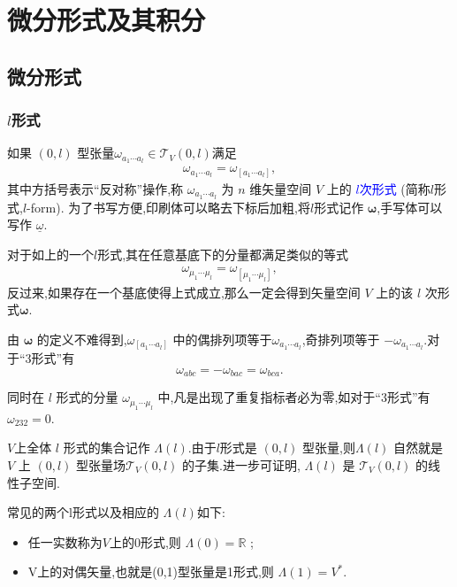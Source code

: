 \chapter{微分形式及其积分}

\section{微分形式}
\subsection{$l$形式}
如果 $(0,l)$ 型张量$\omega_{a_1\cdots a_l}\in \mathscr{T}_V(0,l)$满足
\begin{align}
    \omega_{a_1\cdots a_l}=\omega_{[a_1\cdots a_l]},
\end{align}
其中方括号表示“反对称”操作,称
$\omega_{a_1\cdots a_l}$ 为 $n$ 维矢量空间 $V$ 上的 \textcolor{blue}{$l$次形式}  (简称$l$形式,$l$-form).
为了书写方便,印刷体可以略去下标后加粗,将$l$形式记作 $\boldsymbol{\omega}$,手写体可以写作 $\underline{\omega}$.

对于如上的一个$l$形式,其在任意基底下的分量都满足类似的等式
\begin{align}
\omega_{\mu_1\cdots \mu_l}=\omega_{[\mu_1\cdots \mu_l]},
\end{align}
反过来,如果存在一个基底使得上式成立,那么一定会得到矢量空间 $V$ 上的该 $l$ 次形式$\boldsymbol{\omega}$.

\begin{remark}
由 $\boldsymbol{\omega}$ 的定义不难得到,$\omega_{[a_1\cdots a_l]}$ 中的偶排列项等于$\omega_{a_1\cdots a_l}$,奇排列项等于 $-\omega_{a_1\cdots a_l}$.对于“3形式”有$$\omega_{abc}=-\omega_{bac}=\omega_{bca}.$$

同时在 $l$ 形式的分量 $\omega_{\mu_1\cdots\mu_l}$ 中,凡是出现了重复指标者必为零,如对于“3形式”有 $\omega_{232}=0$.
\end{remark}

$V$上全体 $l$ 形式的集合记作 $\Lambda(l)$.由于$l$形式是 $(0,l)$ 型张量,则$\Lambda(l)$ 自然就是 $V$ 上 $(0,l)$ 型张量场$\mathscr{T}_V(0,l)$ 的子集.进一步可证明, $\Lambda(l)$ 是 $\mathscr{T}_V(0,l)$ 的线性子空间.

常见的两个l形式以及相应的 $\Lambda(l)$如下:
\begin{itemize}
\item 任一实数称为$V$上的0形式,则 $\Lambda(0)=\mathbb{R}$ ;
\item V上的对偶矢量,也就是(0,1)型张量是1形式,则 $\Lambda(1)=V^*$.
\end{itemize}

